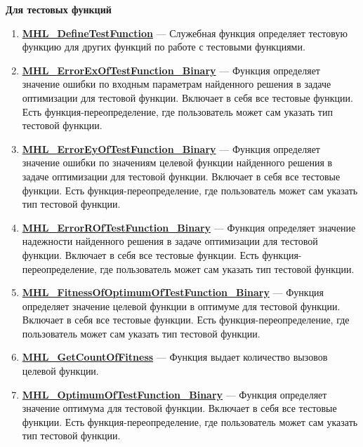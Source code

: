 \documentclass[a4paper,12pt]{article}
\begin{document}
\textbf{Для тестовых функций}
\begin{enumerate}

\item \textbf{\hyperref[MHL_DefineTestFunction]{MHL\_DefineTestFunction}} --- Служебная функция определяет тестовую функцию для других функций по работе с тестовыми функциями.

\item \textbf{\hyperref[MHL_ErrorExOfTestFunction_Binary]{MHL\_ErrorExOfTestFunction\_Binary}} --- Функция определяет значение ошибки по входным параметрам найденного решения в задаче оптимизации для тестовой функции. Включает в себя все тестовые функции. Есть функция-переопределение, где пользователь может сам указать тип тестовой функции.

\item \textbf{\hyperref[MHL_ErrorEyOfTestFunction_Binary]{MHL\_ErrorEyOfTestFunction\_Binary}} --- Функция определяет значение ошибки по значениям целевой функции найденного решения в задаче оптимизации для тестовой функции. Включает в себя все тестовые функции. Есть функция-переопределение, где пользователь может сам указать тип тестовой функции.

\item \textbf{\hyperref[MHL_ErrorROfTestFunction_Binary]{MHL\_ErrorROfTestFunction\_Binary}} --- Функция определяет значение надежности найденного решения в задаче оптимизации для тестовой функции. Включает в себя все тестовые функции. Есть функция-переопределение, где пользователь может сам указать тип тестовой функции.

\item \textbf{\hyperref[MHL_FitnessOfOptimumOfTestFunction_Binary]{MHL\_FitnessOfOptimumOfTestFunction\_Binary}} --- Функция определяет значение целевой функции в оптимуме для тестовой функции. Включает в себя все тестовые функции. Есть функция-переопределение, где пользователь может сам указать тип тестовой функции.

\item \textbf{\hyperref[MHL_GetCountOfFitness]{MHL\_GetCountOfFitness}} --- Функция выдает количество вызовов целевой функции.

\item \textbf{\hyperref[MHL_OptimumOfTestFunction_Binary]{MHL\_OptimumOfTestFunction\_Binary}} --- Функция определяет значение оптимума для тестовой функции. Включает в себя все тестовые функции. Есть функция-переопределение, где пользователь может сам указать тип тестовой функции.


\end{enumerate}
\end{document}
